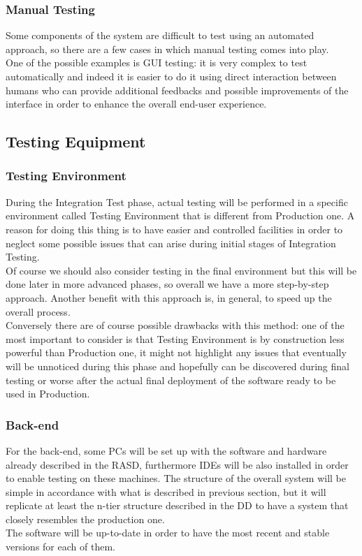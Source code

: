 \subsubsection{Manual Testing}
Some components of the system are difficult to test using an automated approach, so there are a few cases in which manual testing comes into play. \\ One of the possible examples is GUI testing: it is very complex to test automatically and indeed it is easier to do it using direct interaction between humans who can provide additional feedbacks and possible improvements of the interface in order to enhance the overall end-user experience. 

\subsection{Testing Equipment}

\subsubsection{Testing Environment}
During the Integration Test phase, actual testing will be performed in a specific environment called Testing Environment that is different from Production one. A reason for doing this thing is to have easier and controlled facilities in order to neglect some possible issues that can arise during initial stages of Integration Testing. \\ Of course we should also consider testing in the final environment but this will be done later in more advanced phases, so overall we have a more step-by-step approach. Another benefit with this approach is, in general, to speed up the overall process. \\ Conversely there are of course possible drawbacks with this method: one of the most important to consider is that Testing Environment is by construction less powerful than Production one, it might not highlight any issues that eventually will be unnoticed during this phase and hopefully can be discovered during final testing or worse after the actual final deployment of the software ready to be used in Production.  

\subsubsection{Back-end}
For the back-end, some PCs will be set up with the software and hardware already described in the RASD, furthermore IDEs will be also installed in order to enable testing on these machines. The structure of the overall system will be simple in accordance with what is described in previous section, but it will replicate at least the n-tier structure described in the DD to have a system that closely resembles the production one. \\ The software will be up-to-date in order to have the most recent and stable versions for each of them.

